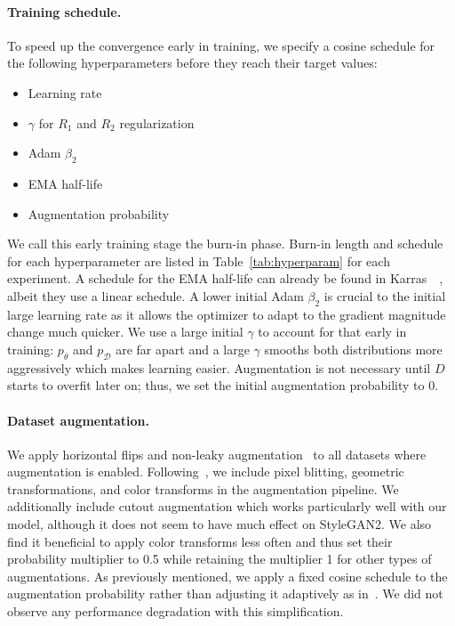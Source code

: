 \paragraph{Training schedule.}
To speed up the convergence early in training, we specify a cosine schedule for the following hyperparameters before they reach their target values: 
\begin{itemize}[parsep=2pt,topsep=0pt,itemsep=0pt]
    \item Learning rate
    \item $\gamma$ for $R_1$ and $R_2$ regularization
    \item Adam $\beta_2$
    \item EMA half-life
    \item Augmentation probability
\end{itemize}
We call this early training stage the burn-in phase. Burn-in length and schedule for each hyperparameter are listed in Table~\ref{tab:hyperparam} for each experiment. A schedule for the EMA half-life can already be found in Karras~\etal~\cite{sg2ada}, albeit they use a linear schedule. A lower initial Adam $\beta_2$ is crucial to the initial large learning rate as it allows the optimizer to adapt to the gradient magnitude change much quicker. We use a large initial $\gamma$ to account for that early in training: $p_\theta$ and $p_\mathcal{D}$ are far apart and a large $\gamma$ smooths both distributions more aggressively which makes learning easier. Augmentation is not necessary until $D$ starts to overfit later on; thus, we set the initial augmentation probability to 0.

\vspace{-0.1cm}
\paragraph{Dataset augmentation.}
We apply horizontal flips and non-leaky augmentation~\cite{sg2ada} to all datasets where augmentation is enabled. Following~\cite{sg2ada}, we include pixel blitting, geometric transformations, and color transforms in the augmentation pipeline. We additionally include cutout augmentation which works particularly well with our model, although it does not seem to have much effect on StyleGAN2. We also find it beneficial to apply color transforms less often and thus set their probability multiplier to 0.5 while retaining the multiplier 1 for other types of augmentations. As previously mentioned, we apply a fixed cosine schedule to the augmentation probability rather than adjusting it adaptively as in~\cite{sg2ada}. We did not observe any performance degradation with this simplification.

